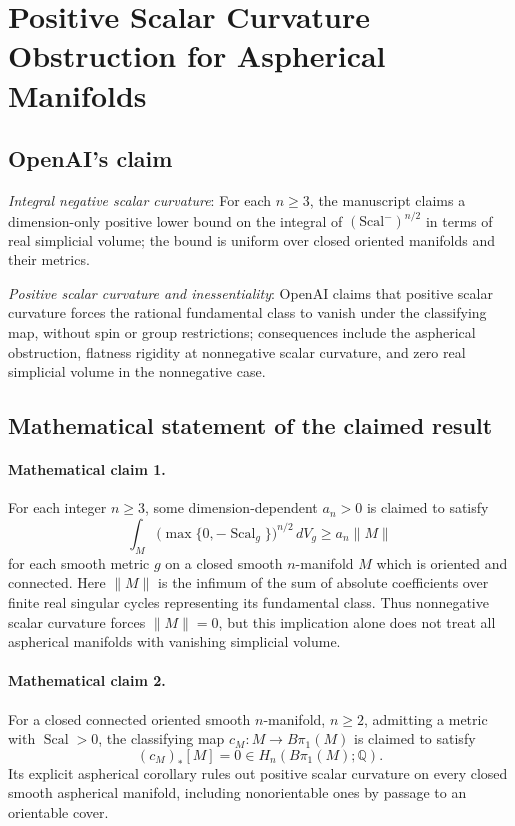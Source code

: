 \documentclass[11pt]{article}
\begin{document}
\section*{Positive Scalar Curvature Obstruction for Aspherical Manifolds}

\subsection{OpenAI's claim}
\textit{Integral negative scalar curvature}: For each $n\ge3$, the manuscript claims a dimension-only positive lower bound on the integral of $(\mathrm{Scal}^-)^{n/2}$ in terms of real simplicial volume; the bound is uniform over closed oriented manifolds and their metrics.

\textit{Positive scalar curvature and inessentiality}: OpenAI claims that positive scalar curvature forces the rational fundamental class to vanish under the classifying map, without spin or group restrictions; consequences include the aspherical obstruction, flatness rigidity at nonnegative scalar curvature, and zero real simplicial volume in the nonnegative case.

\subsection{Mathematical statement of the claimed result}
\paragraph{Mathematical claim 1.} For each integer $n\ge3$, some dimension-dependent $a_n>0$ is claimed to satisfy \[\int_M\bigl(\max\{0,-\operatorname{Scal}_g\}\bigr)^{n/2}\,dV_g\ge a_n\|M\|\] for each smooth metric $g$ on a closed smooth $n$-manifold $M$ which is oriented and connected. Here $\|M\|$ is the infimum of the sum of absolute coefficients over finite real singular cycles representing its fundamental class. Thus nonnegative scalar curvature forces $\|M\|=0$, but this implication alone does not treat all aspherical manifolds with vanishing simplicial volume.

\paragraph{Mathematical claim 2.} For a closed connected oriented smooth $n$-manifold, $n\ge2$, admitting a metric with $\operatorname{Scal}>0$, the classifying map $c_M:M\to B\pi_1(M)$ is claimed to satisfy \[(c_M)_*[M]=0\in H_n(B\pi_1(M);\mathbb Q).\] Its explicit aspherical corollary rules out positive scalar curvature on every closed smooth aspherical manifold, including nonorientable ones by passage to an orientable cover.
\end{document}

